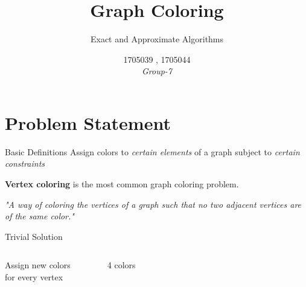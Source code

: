 \documentclass[12pt]{beamer}
\title{Graph Coloring}
\subtitle{Exact and Approximate Algorithms}
\author{1705039 , 1705044 \\ \textit{\vspace*{-2cm}Group-7}}
\date[]{}
\begin{document}
	
	{
		\begin{frame}
			\titlepage
		\end{frame}
	}
	
	
	
	
	\section{Problem Statement}
	\begin{frame}{Basic Definitions}
		Assign colors to \emph{certain elements} of a graph subject to \emph{certain constraints} \vspace{20pt}\pause
		
		\textbf{Vertex coloring} is the most common graph coloring problem. \vspace{20pt}\pause
		
		\centering
		\emph{"A way of coloring the vertices of a graph such that no two adjacent vertices are of the same color."} 
	\end{frame}
	
	\begin{frame}{Trivial Solution}
		\begin{columns}
			\centering
			Assign new colors \\ 
			for every vertex
			
			\begin{figure}[h]
				\centering
				
				
				\label{fig:1}
				\caption{4 colors}
			\end{figure}
			
		\end{columns}
	\end{frame}
	
\end{document}
